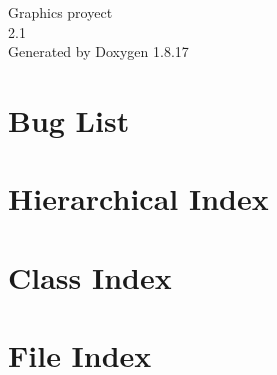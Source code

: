 \let\mypdfximage\pdfximage\def\pdfximage{\immediate\mypdfximage}\documentclass[twoside]{book}
\newcommand{\+}{\discretionary{\mbox{\scriptsize$\hookleftarrow$}}{}{}}
\newcommand{\clearemptydoublepage}{%
  \newpage{\pagestyle{empty}\cleardoublepage}%
}
\begin{document}
\hypersetup{pageanchor=false,
             bookmarksnumbered=true,
             pdfencoding=unicode
            }
\begin{titlepage}
\vspace*{7cm}
\begin{center}%
{\Large Graphics proyect \\[1ex]\large 2.\+1 }\\
\vspace*{1cm}
{\large Generated by Doxygen 1.8.17}\\
\end{center}
\end{titlepage}
\clearemptydoublepage
{}
\tableofcontents
\clearemptydoublepage
{}
\hypersetup{pageanchor=true}

\chapter{Bug List}
\label{bug}

\chapter{Hierarchical Index}

\chapter{Class Index}

\chapter{File Index}

\end{document}
